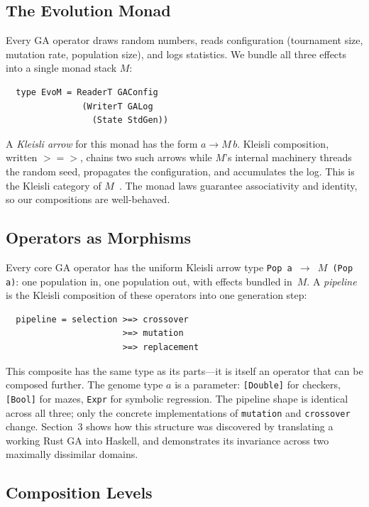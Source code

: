 \documentclass[dvipsnames,format=sigconf,anonymous=false,review=false]{acmart}
\begin{document}
\subsection{The Evolution Monad}

Every GA operator draws random numbers, reads configuration (tournament size, mutation rate, population size), and logs statistics. We bundle all three effects into a single monad stack $M$:

\begin{verbatim}
  type EvoM = ReaderT GAConfig
               (WriterT GALog
                 (State StdGen))
\end{verbatim}

\noindent A \emph{Kleisli arrow} for this monad has the form $a \to M\,b$. Kleisli composition, written $\mathbin{>\!\!=\!\!>}$, chains two such arrows while $M$'s internal machinery threads the random seed, propagates the configuration, and accumulates the log. This is the Kleisli category of $M$~\cite{maclane1971categories, moggi1991notions}. The monad laws guarantee associativity and identity, so our compositions are well-behaved.

\subsection{Operators as Morphisms}

Every core GA operator has the uniform Kleisli arrow type \texttt{Pop\,a $\to$ $M$\,(Pop\,a)}: one population in, one population out, with effects bundled in~$M$. A \emph{pipeline} is the Kleisli composition of these operators into one generation step:

\begin{verbatim}
  pipeline = selection >=> crossover
                       >=> mutation
                       >=> replacement
\end{verbatim}

\noindent This composite has the same type as its parts---it is itself an operator that can be composed further. The genome type $a$ is a parameter: \texttt{[Double]} for checkers, \texttt{[Bool]} for mazes, \texttt{Expr} for symbolic regression. The pipeline shape is identical across all three; only the concrete implementations of \texttt{mutation} and \texttt{crossover} change. Section~3 shows how this structure was discovered by translating a working Rust GA into Haskell, and demonstrates its invariance across two maximally dissimilar domains.

\subsection{Composition Levels}
\end{document}
